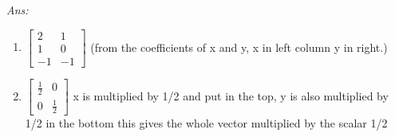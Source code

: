 \documentclass[12pt]{amsart}
\newcommand\sol[1]{
\medskip
\begin{mdframed}
\emph{Ans:\\} #1
\end{mdframed}
\medskip
}
\begin{document}
\begin{enumerate}
\begin{enumerate}
\end{enumerate}

\sol{
  \begin{enumerate}
    \item
      $\left[\begin{matrix} 2 & 1 \\ 1 & 0 \\ -1 & -1\end{matrix}\right]$ (from the coefficients of x and y, x in left column y in right.)
    \item
    $\left[\begin{matrix} \frac{1}{2} & 0 \\ 0 & \frac{1}{2}\end{matrix}\right]$ x is multiplied by 1/2 and put in the top, y is also multiplied by 1/2 in the bottom this gives the whole vector multiplied by the scalar 1/2
  \end{enumerate}
}


\end{enumerate}
\end{document}
